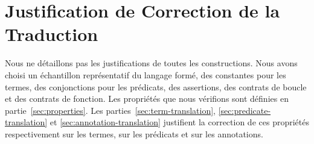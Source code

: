 






\section{Justification de Correction de la Traduction}
\label{sec:justif}


Nous ne détaillons pas les justifications de toutes les constructions.
Nous avons choisi un échantillon représentatif du langage formé, des constantes
pour les termes, des conjonctions pour les prédicats, des assertions, des
contrats de boucle et des contrats de fonction.
Les propriétés que nous vérifions sont définies en partie~\ref{sec:properties}.
Les parties~\ref{sec:term-translation}, \ref{sec:predicate-translation} et
\ref{sec:annotation-translation} justifient la correction de ces propriétés
respectivement sur les termes, sur les prédicats et sur les annotations.


